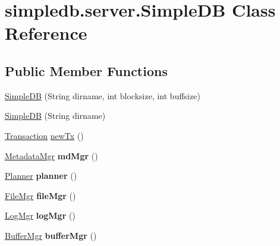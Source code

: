 \hypertarget{classsimpledb_1_1server_1_1SimpleDB}{}\section{simpledb.\+server.\+Simple\+DB Class Reference}
\label{classsimpledb_1_1server_1_1SimpleDB}
\subsection*{Public Member Functions}
\begin{DoxyCompactItemize}
\item 
\hyperlink{classsimpledb_1_1server_1_1SimpleDB_a29c01cb395522b7c79e005122e504195}{Simple\+DB} (String dirname, int blocksize, int buffsize)
\item 
\hyperlink{classsimpledb_1_1server_1_1SimpleDB_a66c6ec3e675c8050b83f18a25808f167}{Simple\+DB} (String dirname)
\item 
\hyperlink{classsimpledb_1_1tx_1_1Transaction}{Transaction} \hyperlink{classsimpledb_1_1server_1_1SimpleDB_abc25117f80a115c4e95247c6505c9f7a}{new\+Tx} ()
\item 
\mbox{\label{classsimpledb_1_1server_1_1SimpleDB_aaf7df4889f127b1775938adea84b0c70}} 
\hyperlink{classsimpledb_1_1metadata_1_1MetadataMgr}{Metadata\+Mgr} {\bfseries md\+Mgr} ()
\item 
\mbox{\label{classsimpledb_1_1server_1_1SimpleDB_afb1ba19d4194eee647f48392ff295783}} 
\hyperlink{classsimpledb_1_1plan_1_1Planner}{Planner} {\bfseries planner} ()
\item 
\mbox{\label{classsimpledb_1_1server_1_1SimpleDB_a0cea6e873052903c92b320250a52d072}} 
\hyperlink{classsimpledb_1_1file_1_1FileMgr}{File\+Mgr} {\bfseries file\+Mgr} ()
\item 
\mbox{\label{classsimpledb_1_1server_1_1SimpleDB_a50ab892e27904c08ce992a8e808b94bc}} 
\hyperlink{classsimpledb_1_1log_1_1LogMgr}{Log\+Mgr} {\bfseries log\+Mgr} ()
\item 
\mbox{\label{classsimpledb_1_1server_1_1SimpleDB_ad958e3d531d7cf8f45f78755c86edb8a}} 
\hyperlink{classsimpledb_1_1buffer_1_1BufferMgr}{Buffer\+Mgr} {\bfseries buffer\+Mgr} ()
\end{DoxyCompactItemize}

